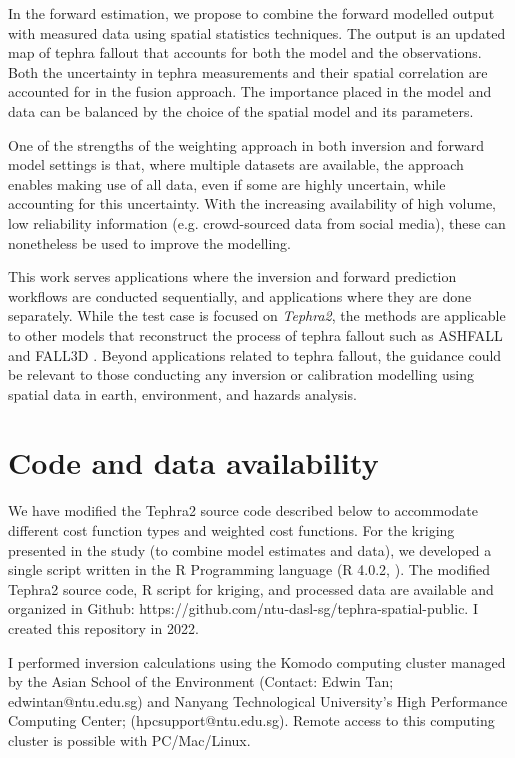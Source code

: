 In the forward estimation, we propose to combine the forward modelled output with measured data using spatial statistics techniques. The output is an updated map of tephra fallout that accounts for both the model and the observations. Both the uncertainty in tephra measurements and their spatial correlation are accounted for in the fusion approach. The importance placed in the model and data can be balanced by the choice of the spatial model and its parameters. 

One of the strengths of the weighting approach in both inversion and forward model settings is that, where multiple datasets are available, the approach enables making use of all data, even if some are highly uncertain, while accounting for this uncertainty. With the increasing availability of high volume, low reliability information (e.g. crowd-sourced data from social media), these can nonetheless be used to improve the modelling. 

This work serves applications where the inversion and forward prediction workflows are conducted sequentially, and applications where they are done separately. While the test case is focused on \textit{Tephra2}, the methods are applicable to other models that reconstruct the process of tephra fallout such as ASHFALL and FALL3D \citep{hurst1999performance, folch2009fall3d}. Beyond applications related to tephra fallout, the guidance could be relevant to those conducting any inversion or calibration modelling using spatial data in earth, environment, and hazards analysis.


\section{Code and data availability}
We have modified the Tephra2 source code described below to accommodate different cost function types and weighted cost functions. For the kriging presented in the study (to combine model estimates and data), we developed a single script written in the R Programming language  (R 4.0.2, \cite{team2013r}). The modified Tephra2 source code, R script for kriging, and processed data are available and organized in Github: https://github.com/ntu-dasl-sg/tephra-spatial-public. I created this repository in 2022.

I performed inversion calculations using the Komodo computing cluster managed by the Asian School of the Environment (Contact: Edwin Tan; edwintan@ntu.edu.sg) and Nanyang Technological University’s High Performance Computing Center; (hpcsupport@ntu.edu.sg). Remote access to this computing cluster is possible with PC/Mac/Linux.

